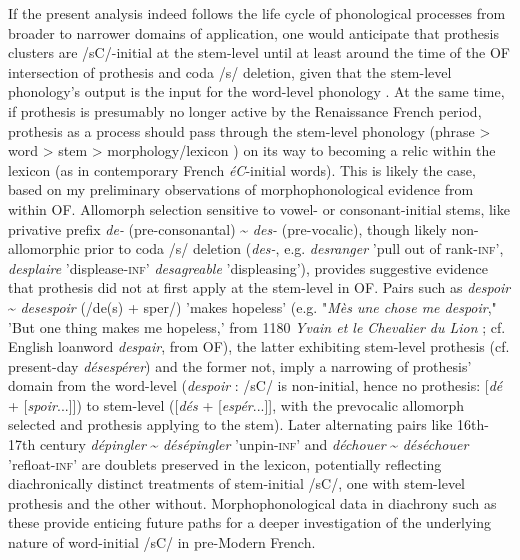 \documentclass[output=paper,colorlinks,citecolor=brown,
]{langscibook}
\begin{document}
If the present analysis indeed follows the life cycle of phonological processes from broader to narrower domains of application, one would anticipate that prothesis clusters are /sC/-initial at the stem-level until at least around the time of the OF intersection of prothesis and coda /s/ deletion, given that the stem-level phonology's output is the input for the word-level phonology \citep{Kiparsky2015}.  At the same time, if prothesis is presumably no longer active by the Renaissance French period, prothesis as a process should pass through the stem-level phonology (phrase > word > stem > morphology/lexicon \citep{Bermúdez-Otero2015}) on its way to becoming a relic within the lexicon (as in contemporary French \textit{éC}-initial words).  This is likely the case, based on my preliminary observations of morphophonological evidence from within OF.  Allomorph selection sensitive to vowel- or consonant-initial stems, like privative prefix \textit{de-} (pre-consonantal) \~{} \textit{des-} (pre-vocalic), though likely non-allomorphic prior to coda /s/ deletion (\textit{des-}, e.g. \textit{desranger} 'pull out of rank-\textsc{inf}', \textit{desplaire} 'displease-\textsc{inf}' \textit{desagreable} 'displeasing'), provides suggestive evidence that prothesis did not at first apply at the stem-level in OF.  Pairs such as \textit{despoir} \~{} \textit{desespoir} (/de(s) + sper/) 'makes hopeless' (e.g. "\textit{Mès une chose me despoir}," 'But one thing makes me hopeless,' from 1180 \textit{Yvain et le Chevalier du Lion} \citep{Constans1918}; cf. English loanword \textit{despair}, from OF), the latter exhibiting stem-level prothesis (cf. present-day \textit{désespérer}) and the former not, imply a narrowing of prothesis' domain from the word-level (\textit{despoir} : /sC/ is non-initial, hence no prothesis: [\textit{dé} + [\textit{spoir}...]]) to stem-level ([\textit{dés} + [\textit{espér}...]], with the prevocalic allomorph selected and prothesis applying to the stem).  Later alternating pairs like 16th-17th century \textit{dépingler} \~{} \textit{désépingler} 'unpin-\textsc{inf}' and \textit{déchouer} \~{} \textit{déséchouer} 'refloat-\textsc{inf}' are doublets preserved in the lexicon, potentially reflecting diachronically distinct treatments of stem-initial /sC/, one with stem-level prothesis and the other without.  Morphophonological data in diachrony such as these provide enticing future paths for a deeper investigation of the underlying nature of word-initial /sC/ in pre-Modern French.
\end{document}
